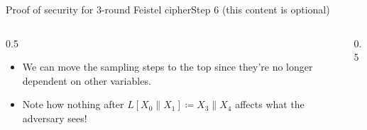 \ifdefined\PRESENTATION\else\PassOptionsToClass{handout}{beamer}\fi\documentclass[aspectratio=169, lualatex]{beamer}
\begin{document}
	\begin{frame}{Proof of security for 3-round Feistel cipher}{Step 6 (this content is optional)}
		\begin{columns}[c]
			\begin{column}{0.5\textwidth}
				\begin{itemize}
					\item We can move the sampling steps to the top since they're no longer dependent on other variables.
					\item Note how nothing after $L[X_0\|X_1] \coloneq X_3\|X_4$ affects what the adversary sees!
				\end{itemize}
			\end{column}
			\begin{column}{0.5\textwidth}
				\vspace{-1.5cm}
				\begin{center}
				\end{center}
			\end{column}
		\end{columns}
	\end{frame}
\end{document}
